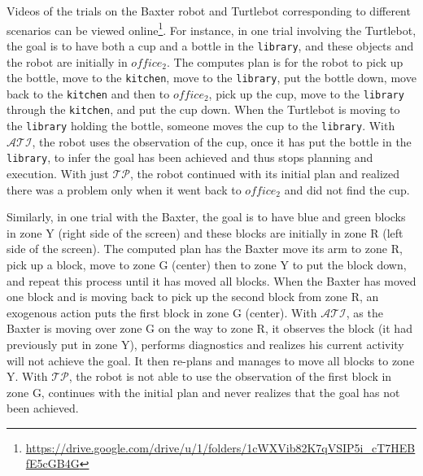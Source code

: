 \documentclass[letterpaper, 10 pt, conference]{ieeeconf}  %
\newcommand{\stt}[1]{{\small\texttt{#1}}}
\begin{document}
Videos of the trials on the Baxter robot and Turtlebot corresponding
to different scenarios can be viewed
online\footnote{\url{https://drive.google.com/drive/u/1/folders/1cWXVib82K7qVSIP5i_cT7HEBfE5cGB4G}}.
For instance, in one trial involving the Turtlebot, the goal is to
have both a cup and a bottle in the \stt{library}, and these objects
and the robot are initially in $office_2$. The computes plan is for
the robot to pick up the bottle, move to the \stt{kitchen}, move to
the \stt{library}, put the bottle down, move back to the \stt{kitchen}
and then to $office_2$, pick up the cup, move to the \stt{library}
through the \stt{kitchen}, and put the cup down. When the Turtlebot is
moving to the \stt{library} holding the bottle, someone moves the cup
to the \stt{library}. With $\mathcal{ATI}$, the robot uses the
observation of the cup, once it has put the bottle in the
\stt{library}, to infer the goal has been achieved and thus stops
planning and execution. With just $\mathcal{TP}$, the robot continued
with its initial plan and realized there was a problem only when it
went back to $office_2$ and did not find the cup.

Similarly, in one trial with the Baxter, the goal is to have blue and
green blocks in zone Y (right side of the screen) and these blocks are
initially in zone R (left side of the screen). The computed plan has
the Baxter move its arm to zone R, pick up a block, move to zone G
(center) then to zone Y to put the block down, and repeat this process
until it has moved all blocks. When the Baxter has moved one block and
is moving back to pick up the second block from zone R, an exogenous
action puts the first block in zone G (center). With $\mathcal{ATI}$,
as the Baxter is moving over zone G on the way to zone R, it observes
the block (it had previously put in zone Y), performs diagnostics and
realizes his current activity will not achieve the goal. It then
re-plans and manages to move all blocks to zone Y. With
$\mathcal{TP}$, the robot is not able to use the observation of the
first block in zone G, continues with the initial plan and never
realizes that the goal has not been achieved.



\end{document}
